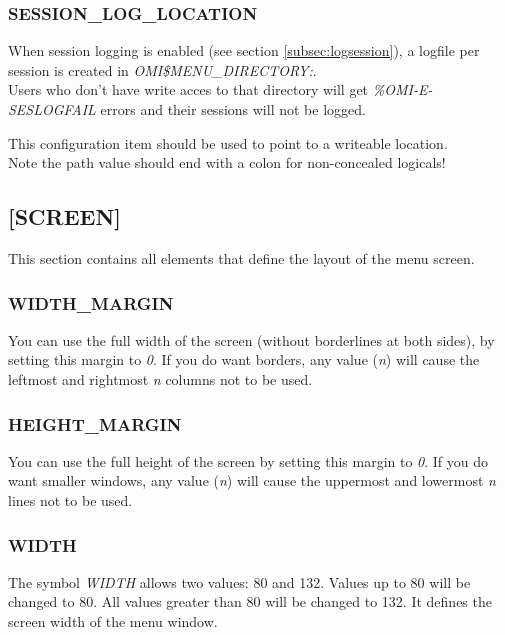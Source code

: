 \documentclass[a4paper]{book}
\begin{document}
\subsubsection{SESSION{\_}LOG{\_}LOCATION}\label{para:sessionlogfile}

When session logging is enabled (see section \ref{subsec:logsession}), a logfile per session is created in \textsl{OMI{\$}MENU{\_}DIRECTORY:}. \\
Users who don't have write acces to that directory will get \textsl{\%OMI-E-SESLOGFAIL} errors and their sessions will not be logged.

This configuration item should be used to point to a writeable location.\\
Note the path value should end with a colon for non-concealed logicals!

\subsection{[SCREEN]}
\label{subsubsec:mylabel17}

This section contains all elements that define the layout of the menu 
screen.

\subsubsection{WIDTH{\_}MARGIN}

You can use the full width of the screen (without borderlines at both 
sides), by setting this margin to \textsl{0}. If you do want borders, any value 
(\textit{n}) will cause the leftmost and rightmost \textit{n} columns not to be used.

\subsubsection{HEIGHT{\_}MARGIN}

You can use the full height of the screen by setting this margin to \textsl{0}. If 
you do want smaller windows, any value (\textit{n}) will cause the uppermost and 
lowermost \textit{n} lines not to be used.

\subsubsection{WIDTH}

The symbol \textsl{WIDTH} allows two values: 80 and 132. Values up to 80 will be 
changed to 80. All values greater than 80 will be changed to 132. It defines 
the screen width of the menu window.
\end{document}
